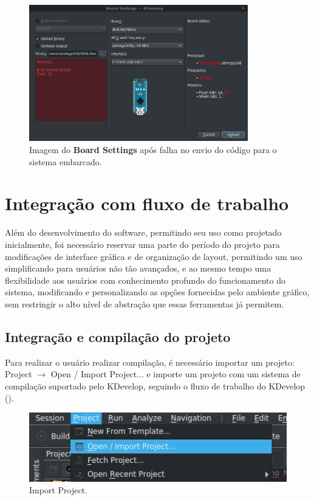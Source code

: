 \begin{figure}[!htb]
  \centering
  \caption[Board Settings com falha no envio]{Imagem do \textbf{Board Settings} após falha no envio do código para o sistema embarcado.}
  \label{fig:boardsettingsndone}
  \includegraphics[width=0.85\textwidth]{figuras/boardsettingsndone.png}
\end{figure}

\section{Integração com fluxo de trabalho}
Além do desenvolvimento do software, permitindo seu uso como projetado inicialmente, foi necessário reservar uma parte do período do projeto para modificações de interface gráfica e de organização de layout, permitindo um uso simplificando para usuários não tão avançados, e ao mesmo tempo uma flexibilidade aos usuários com conhecimento profundo do funcionamento do sistema, modificando e personalizando as opções fornecidas pelo ambiente gráfico, sem restringir o alto nível de abstração que essas ferramentas já permitem.

\subsection{Integração e compilação do projeto}

Para realizar o usuário realizar compilação, é necessário importar um projeto: Project $\rightarrow$ Open / Import Project... e importe um projeto com um sistema de compilação suportado pelo KDevelop, seguindo o fluxo de trabalho do KDevelop ().

\begin{figure}[!htb]
  \centering
  \caption[Import Project]{Import Project.}
  \label{fig:importproject}
  \includegraphics[width=1\textwidth]{figuras/importproject.png}
\end{figure}

